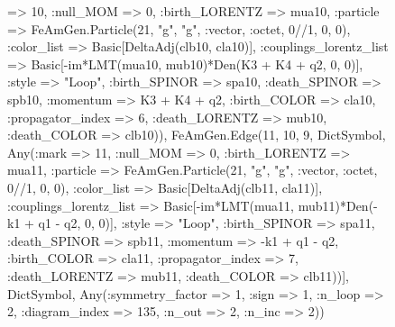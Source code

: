 \documentclass{revtex4}
\begin{document}
\begin{figure}[!htb]
\begin{center}
{=> 10, :null_MOM => 0, :birth_LORENTZ => mua10, :particle => FeAmGen.Particle(21, "g", "g", :vector, :octet, 0//1, 0, 0), :color_list => Basic[DeltaAdj(clb10, cla10)], :couplings_lorentz_list => Basic[-im*LMT(mua10, mub10)*Den(K3 + K4 + q2, 0, 0)], :style => "Loop", :birth_SPINOR => spa10, :death_SPINOR => spb10, :momentum => K3 + K4 + q2, :birth_COLOR => cla10, :propagator_index => 6, :death_LORENTZ => mub10, :death_COLOR => clb10)), FeAmGen.Edge(11, 10, 9, Dict{Symbol, Any}(:mark => 11, :null_MOM => 0, :birth_LORENTZ => mua11, :particle => FeAmGen.Particle(21, "g", "g", :vector, :octet, 0//1, 0, 0), :color_list => Basic[DeltaAdj(clb11, cla11)], :couplings_lorentz_list => Basic[-im*LMT(mua11, mub11)*Den(-k1 + q1 - q2, 0, 0)], :style => "Loop", :birth_SPINOR => spa11, :death_SPINOR => spb11, :momentum => -k1 + q1 - q2, :birth_COLOR => cla11, :propagator_index => 7, :death_LORENTZ => mub11, :death_COLOR => clb11))], Dict{Symbol, Any}(:symmetry_factor => 1, :sign => 1, :n_loop => 2, :diagram_index => 135, :n_out => 2, :n_inc => 2)) 
}
\end{center}
\end{figure}
\end{document}
